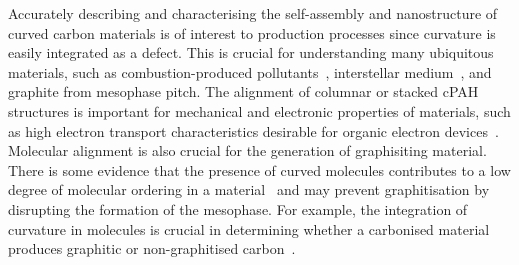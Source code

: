 Accurately describing and characterising the self-assembly and nanostructure of curved carbon materials is of interest to production processes since curvature is easily integrated as a defect. This is crucial for understanding many ubiquitous materials, such as combustion-produced pollutants~\cite{Martin2018flexo}, interstellar medium~\cite{Lovas2005}, and graphite from mesophase pitch. The alignment of columnar or stacked cPAH structures is important for mechanical and electronic properties of materials, such as high electron transport characteristics desirable for organic electron devices~\cite{wang2015electronic}. Molecular alignment is also crucial for the generation of graphisiting material. There is some evidence that the presence of curved molecules contributes to a low degree of molecular ordering in a material~\cite{zhong2018structural} and may prevent graphitisation by disrupting the formation of the mesophase. For example, the integration of curvature in molecules is crucial in determining whether a carbonised material produces graphitic or non-graphitised carbon~\cite{abrahamson2018carbon}. 
%


